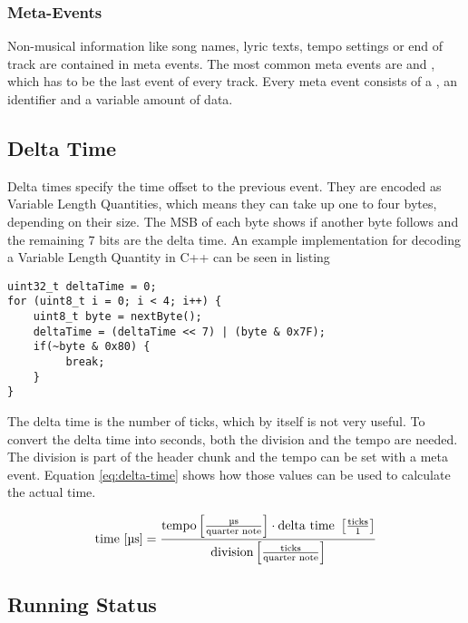 \subsubsection{Meta-Events}

Non-musical information like song names, lyric texts, tempo settings or end of track are contained in meta events. The most common meta events are  and , which has to be the last event of every track. Every meta event consists of a , an identifier and a variable amount of data.

\subsection{Delta Time}

Delta times specify the time offset to the previous event. They are encoded as Variable Length Quantities, which means they can take up one to four bytes, depending on their size. The MSB %
of each byte shows if another byte follows and the remaining 7 bits are the delta time. An example implementation for decoding a Variable Length Quantity in C++ can be seen in listing

\begin{lstlisting}
uint32_t deltaTime = 0;
for (uint8_t i = 0; i < 4; i++) {
    uint8_t byte = nextByte();
    deltaTime = (deltaTime << 7) | (byte & 0x7F);
    if(~byte & 0x80) {
         break;
    }
}
\end{lstlisting}

The delta time is the number of ticks, which by itself is not very useful. To convert the delta time into seconds, both the division and the tempo are needed. The division is part of the header chunk and the tempo can be set with a meta event. Equation \ref{eq:delta-time} shows how those values can be used to calculate the actual time.

\begin{equation}\label{eq:delta-time}
    \textnormal{time [\textmu s]} = \frac{{\textnormal{tempo} \left[ \frac{\textnormal{\textmu s}}{\textnormal{quarter note}} \right] \cdot \textnormal{delta time } \left[\frac{\textnormal{ticks}}{1}\right]}}{\textnormal{division}  \left[ \frac{\textnormal{ticks}}{\textnormal{quarter note}} \right]}
\end{equation}

\subsection{Running Status}

